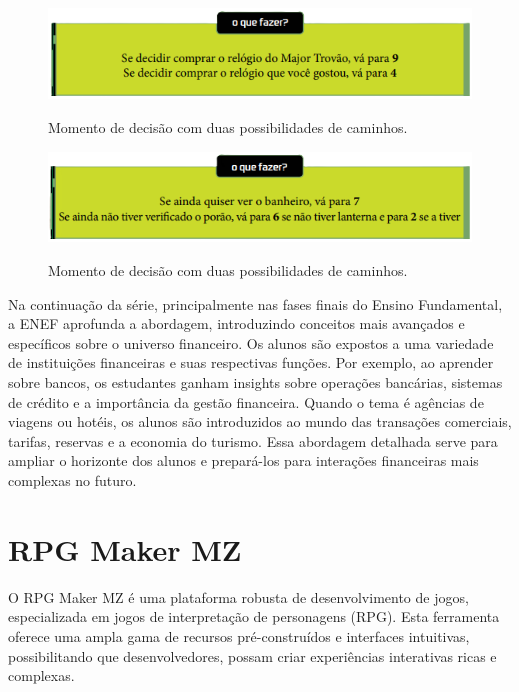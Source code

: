 \begin{figure}[ht]
	\centering
	\caption{Momento de decisão com duas possibilidades de caminhos.}
	\includegraphics[scale=1]{Textuais/Pictures/Picture2.png}
	\label{fig:figure-2}
\end{figure}
\begin{figure}[ht]
	\centering
	\caption{Momento de decisão com duas possibilidades de caminhos.}
	\includegraphics[scale=1]{Textuais/Pictures/Picture3.png}
	\label{fig:figure-3}
\end{figure}

\newpage

Na continuação da série, principalmente nas fases finais do Ensino Fundamental, a ENEF aprofunda a abordagem, introduzindo conceitos mais avançados e específicos sobre o universo financeiro. Os alunos são expostos a uma variedade de instituições financeiras e suas respectivas funções. Por exemplo, ao aprender sobre bancos, os estudantes ganham insights sobre operações bancárias, sistemas de crédito e a importância da gestão financeira. Quando o tema é agências de viagens ou hotéis, os alunos são introduzidos ao mundo das transações comerciais, tarifas, reservas e a economia do turismo. Essa abordagem detalhada serve para ampliar o horizonte dos alunos e prepará-los para interações financeiras mais complexas no futuro.

\section{RPG Maker MZ}
O RPG Maker MZ é uma plataforma robusta de desenvolvimento de jogos, especializada em jogos de interpretação de personagens (RPG). Esta ferramenta oferece uma ampla gama de recursos pré-construídos e interfaces intuitivas, possibilitando que desenvolvedores, possam criar experiências interativas ricas e complexas. \cite{RPGMakerMZ}

